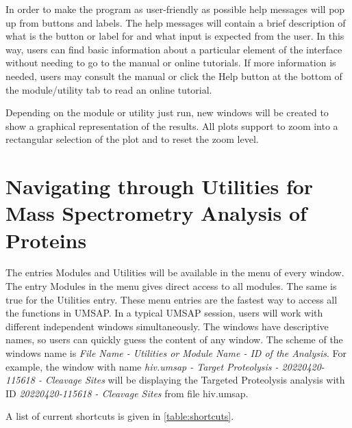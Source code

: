 In order to make the program as user-friendly as possible help messages will pop up
from buttons and labels. The help messages will contain a brief description of what
is the button or label for and what input is expected from the user. In this way, users
can find basic information about a particular element of the interface without needing
to go to the manual or online tutorials. If more information is needed, users may
consult the manual or click the Help button at the bottom of the module/utility tab to
read an online tutorial. 

Depending on the module or utility just run, new windows will be created to show a
graphical representation of the results. All plots support to zoom into a rectangular
selection of the plot and to reset the zoom level.

\section{Navigating through Utilities for Mass Spectrometry Analysis of Proteins}

The entries Modules and Utilities will be available in the menu of every window.
The entry Modules in the menu gives direct access to all modules. The same is true for
the Utilities entry. These menu entries are the fastest way to access all the functions
in UMSAP. In a typical UMSAP session, users will work with different independent windows
simultaneously. The windows have descriptive names, so users can quickly guess the content
of any window. The scheme of the windows name is
\textit{File Name - Utilities or Module Name - ID of the Analysis}. For example, the window
with name \textit{hiv.umsap - Target Proteolysis - 20220420-115618 - Cleavage Sites} will be
displaying the Targeted Proteolysis analysis with ID \textit{20220420-115618 - Cleavage Sites} from
file hiv.umsap.

A list of current shortcuts is given in \autoref{table:shortcuts}.

